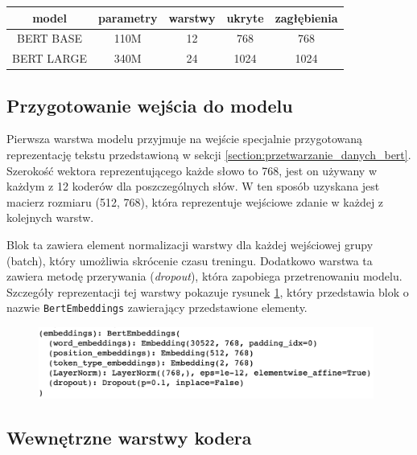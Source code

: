\begin{table}[t]
\label{tab:tabela_bert}
\centering\footnotesize%
\begin{tabular}{c c c c c}
\toprule
model & parametry & warstwy & ukryte & zagłębienia \\
\midrule
BERT BASE   & 110M & 12 & 768 & 768 \\
BERT LARGE   & 340M & 24 & 1024 & 1024 \\
\bottomrule
\end{tabular}
\end{table}

\subsection{Przygotowanie wejścia do modelu}

Pierwsza warstwa modelu przyjmuje na wejście specjalnie przygotowaną reprezentację tekstu przedstawioną w sekcji \ref{section:przetwarzanie_danych_bert}. Szerokość wektora reprezentującego każde słowo to 768, jest on używany w każdym z 12 koderów dla poszczególnych słów. W ten sposób uzyskana jest macierz rozmiaru (512, 768), która reprezentuje wejściowe zdanie w każdej z kolejnych warstw.

Blok ta zawiera element normalizacji warstwy dla każdej wejściowej grupy (batch), który umożliwia skrócenie czasu treningu. Dodatkowo warstwa ta zawiera metodę przerywania (\textit{dropout}), która zapobiega przetrenowaniu modelu. Szczegóły reprezentacji tej warstwy pokazuje rysunek \ref{rys:bert_embeddings}, który przedstawia blok o nazwie \texttt{BertEmbeddings} zawierający przedstawione elementy.

\begin{figure}[t]
\centering\includegraphics[width=11cm]{figures/reports/bert_embeddings.png}
\label{rys:bert_embeddings}
\end{figure}

\subsection{Wewnętrzne warstwy kodera}

